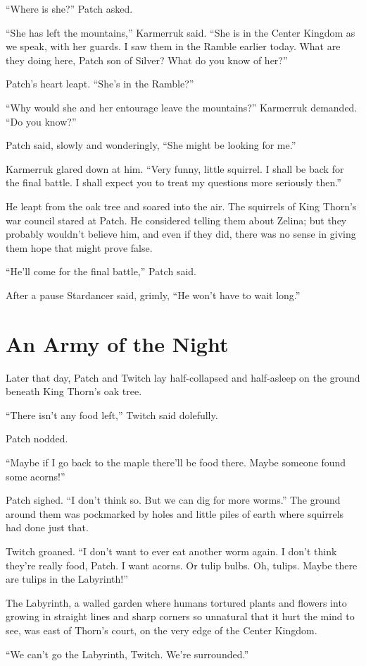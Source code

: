 \documentclass[ebook,oneside,openany,17pt]{memoir}
\renewcommand{\thechapter}{\Roman{chapter}}
\newcounter{sections}
\newcommand{\sections}[1]{%
  \section*{#1}
  \addtocounter{sections}{1}%
  \pdfbookmark[1]{#1}{section.\thechapter.\thesections}}
\begin{document}
“Where is she?” Patch asked.

“She has left the mountains,” Karmerruk said. “She is in the Center
Kingdom as we speak, with her guards. I saw them in the Ramble earlier
today. What are they doing here, Patch son of Silver? What do you know
of her?”

Patch’s heart leapt. “She’s in the Ramble?”

“Why would she and her entourage leave the mountains?” Karmerruk
demanded. “Do you know?”

Patch said, slowly and wonderingly, “She might be looking for me.”

Karmerruk glared down at him. “Very funny, little squirrel. I shall be
back for the final battle. I shall expect you to treat my questions
more seriously then.”

He leapt from the oak tree and soared into the air. The squirrels of
King Thorn’s war council stared at Patch. He considered telling them
about Zelina; but they probably wouldn’t believe him, and even if they
did, there was no sense in giving them hope that might prove false.

“He’ll come for the final battle,” Patch said.

After a pause Stardancer said, grimly, “He won’t have to wait long.”


\sections{An Army of the Night}

Later that day, Patch and Twitch lay half-collapsed and half-asleep on
the ground beneath King Thorn’s oak tree.

“There isn’t any food left,” Twitch said dolefully.

Patch nodded.

“Maybe if I go back to the maple there’ll be food there. Maybe someone
found some acorns!”

Patch sighed. “I don’t think so. But we can dig for more worms.” The
ground around them was pockmarked by holes and little piles of earth
where squirrels had done just that.

Twitch groaned. “I don’t want to ever eat another worm again. I don’t
think they’re really food, Patch. I want acorns. Or tulip bulbs. Oh,
tulips. Maybe there are tulips in the Labyrinth!”

The Labyrinth, a walled garden where humans tortured plants and
flowers into growing in straight lines and sharp corners so unnatural
that it hurt the mind to see, was east of Thorn’s court, on the very
edge of the Center Kingdom.

“We can’t go the Labyrinth, Twitch. We’re surrounded.”
\end{document}
